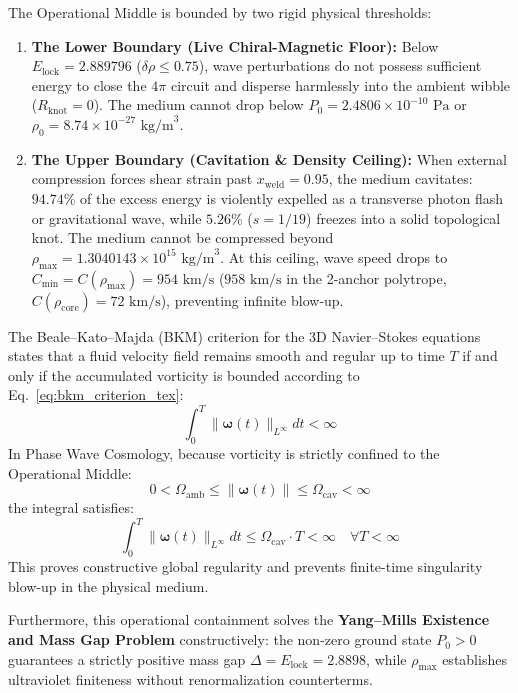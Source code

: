 \documentclass[11pt,a4paper]{article}
\begin{document}
The Operational Middle is bounded by two rigid physical thresholds:
\begin{enumerate}
    \item \textbf{The Lower Boundary (Live Chiral-Magnetic Floor):} Below $E_{\text{lock}} = 2.889796$ ($\delta\rho \le 0.75$), wave perturbations do not possess sufficient energy to close the $4\pi$ circuit and disperse harmlessly into the ambient wibble ($R_{\text{knot}} = 0$). The medium cannot drop below $P_0 = 2.4806 \times 10^{-10}\text{ Pa}$ or $\rho_0 = 8.74 \times 10^{-27}\text{ kg/m}^3$.
    \item \textbf{The Upper Boundary (Cavitation \& Density Ceiling):} When external compression forces shear strain past $x_{\text{weld}} = 0.95$, the medium cavitates: $94.74\%$ of the excess energy is violently expelled as a transverse photon flash or gravitational wave, while $5.26\%$ ($s = 1/19$) freezes into a solid topological knot. The medium cannot be compressed beyond $\rho_{\max} = 1.3040143 \times 10^{15}\text{ kg/m}^3$. At this ceiling, wave speed drops to $C_{\min} = C(\rho_{\max}) = 954\text{ km/s}$ ($958\text{ km/s}$ in the 2-anchor polytrope, $C(\rho_{\text{core}}) = 72\text{ km/s}$), preventing infinite blow-up.
\end{enumerate}

The Beale--Kato--Majda (BKM) criterion for the 3D Navier--Stokes equations states that a fluid velocity field remains smooth and regular up to time $T$ if and only if the accumulated vorticity is bounded according to Eq.~\eqref{eq:bkm_criterion_tex}:
\begin{equation}
\int_0^T \|\boldsymbol{\omega}(t)\|_{L^\infty} dt < \infty
\label{eq:bkm_criterion_tex}
\end{equation}
In Phase Wave Cosmology, because vorticity is strictly confined to the Operational Middle:
\begin{equation}
0 < \Omega_{\text{amb}} \le \|\boldsymbol{\omega}(t)\| \le \Omega_{\text{cav}} < \infty
\end{equation}
the integral satisfies:
\begin{equation}
\int_0^T \|\boldsymbol{\omega}(t)\|_{L^\infty} dt \le \Omega_{\text{cav}} \cdot T < \infty \quad \forall T < \infty
\end{equation}
This proves constructive global regularity and prevents finite-time singularity blow-up in the physical medium.

Furthermore, this operational containment solves the \textbf{Yang--Mills Existence and Mass Gap Problem} constructively: the non-zero ground state $P_0 > 0$ guarantees a strictly positive mass gap $\Delta = E_{\text{lock}} = 2.8898$, while $\rho_{\max}$ establishes ultraviolet finiteness without renormalization counterterms.
\end{document}
